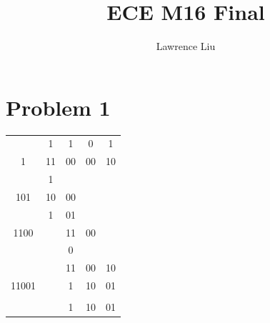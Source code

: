 \documentclass[12pt]{article}
\title{ECE M16 Final}
\author{Lawrence Liu}
\begin{document}
\maketitle
\section*{Problem 1}
\begin{center}
\begin{tabular}{c| c c c c}
    & 1 & 1 & 0 & 1\\
    \cline{2-5}
    1 & 11 & 00 & 00 & 10 \\
    & 1 & & &\\
    \cline{2-2}
    101 & 10 & 00 & &\\
    & 1 & 01 & &\\
    \cline{2-3}
    1100 & & 11 & 00 &\\
    & & 0 & &\\
    \cline{3-4}
    & & 11 & 00 & 10\\
    11001 & & 1 & 10 & 01\\
    \cline{3-5}\\
    & & 1 & 10 & 01
    
\end{tabular}
\end{center}
\end{document}
